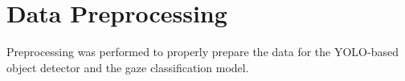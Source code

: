 \section{Data Preprocessing}\label{sec:datapreprocessing}

Preprocessing was performed to properly prepare the data for the YOLO-based object detector and the gaze classification model.


